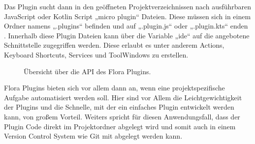 Das Plugin sucht dann in den geöffneten Projektverzeichnissen
nach ausführbaren JavaScript oder Kotlin Script „micro plugin“ 
Dateien. Diese müssen sich in einem Ordner namens „.plugins“ 
befinden und auf „.plugin.js“ oder „.plugin.kts“ enden \cite{FloraPluginMarketplace}.
Innerhalb diese Plugin Dateien kann über die Variable „ide“ auf 
die angebotene Schnittstelle zugegriffen werden. Diese erlaubt 
es unter anderem Actions, Keyboard Shortcuts, Services und 
ToolWindows zu erstellen.

\begin{figure}
    \centering
    \caption{Übersicht über die API des Flora Plugins.}
    \label{fig:FloraPluginAPI}
\end{figure}    
 
Flora Plugins bieten sich vor allem dann an, wenn eine projektspezifische 
Aufgabe automatisiert werden soll. Hier sind vor Allem die 
Leichtgewichtigkeit der Plugins und die Schnelle, mit der ein 
einfaches Plugin entwickelt werden kann, von großem Vorteil. 
Weiters spricht für diesen Anwendungsfall, dass der Plugin Code 
direkt im Projektordner abgelegt wird und somit auch in einem Version 
Control System wie Git mit abgelegt werden kann.
